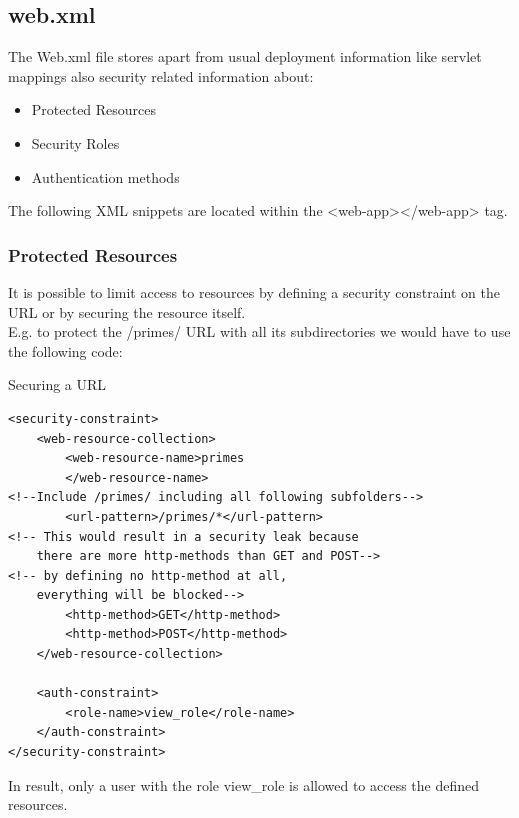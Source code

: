 \documentclass[12pt,a4paper]{report}
\begin{document}
\subsection{web.xml}
The Web.xml file stores apart from usual deployment information like servlet mappings also security related information about:\\
\begin{itemize}
	\item Protected Resources
	\item Security Roles
	\item Authentication methods
\end{itemize}
The following XML snippets are located within the <web-app></web-app> tag.
\newpage
\subsubsection*{Protected Resources}
It is possible to limit access to resources by defining a security constraint on the URL or by securing the resource itself.\\
E.g. to protect the /primes/ URL with all its subdirectories we would have to use the following code:\\
\begin{bclogo}[couleur=yellow!15,arrondi=0.1,logo=\bccrayon, ombre = true]{Securing a URL}
\begin{lstlisting}[style=XML]
<security-constraint>
	<web-resource-collection>
		<web-resource-name>primes
		</web-resource-name>
<!--Include /primes/ including all following subfolders-->
		<url-pattern>/primes/*</url-pattern>
<!-- This would result in a security leak because 
	there are more http-methods than GET and POST-->
<!-- by defining no http-method at all, 
	everything will be blocked-->
		<http-method>GET</http-method>
		<http-method>POST</http-method>
	</web-resource-collection>
	
	<auth-constraint>
		<role-name>view_role</role-name>
	</auth-constraint>
</security-constraint>
\end{lstlisting}
\end{bclogo}
In result, only a user with the role view\_role is allowed to access the defined resources.
\newpage
\end{document}
